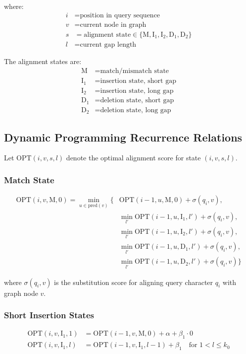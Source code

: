 \documentclass[11pt]{article}
\begin{document}
where:
\begin{align}
i &= \text{position in query sequence} \\
v &= \text{current node in graph} \\
s &= \text{alignment state} \in \{\text{M}, \text{I}_1, \text{I}_2, \text{D}_1, \text{D}_2\} \\
l &= \text{current gap length}
\end{align}

The alignment states are:
\begin{align}
\text{M} &= \text{match/mismatch state} \\
\text{I}_1 &= \text{insertion state, short gap} \\
\text{I}_2 &= \text{insertion state, long gap} \\
\text{D}_1 &= \text{deletion state, short gap} \\
\text{D}_2 &= \text{deletion state, long gap}
\end{align}

\subsection{Dynamic Programming Recurrence Relations}

Let $\text{OPT}(i, v, s, l)$ denote the optimal alignment score for state $(i, v, s, l)$.

\subsubsection{Match State}
\begin{align}
\text{OPT}(i, v, \text{M}, 0) = \min_{u \in \text{pred}(v)} \{ &\text{OPT}(i-1, u, \text{M}, 0) + \sigma(q_i, v), \\
&\min_{l'} \text{OPT}(i-1, u, \text{I}_1, l') + \sigma(q_i, v), \\
&\min_{l'} \text{OPT}(i-1, u, \text{I}_2, l') + \sigma(q_i, v), \\
&\min_{l'} \text{OPT}(i-1, u, \text{D}_1, l') + \sigma(q_i, v), \\
&\min_{l'} \text{OPT}(i-1, u, \text{D}_2, l') + \sigma(q_i, v) \}
\end{align}

where $\sigma(q_i, v)$ is the substitution score for aligning query character $q_i$ with graph node $v$.

\subsubsection{Short Insertion States}
\begin{align}
\text{OPT}(i, v, \text{I}_1, 1) &= \text{OPT}(i-1, v, \text{M}, 0) + \alpha + \beta_1 \cdot 0 \\
\text{OPT}(i, v, \text{I}_1, l) &= \text{OPT}(i-1, v, \text{I}_1, l-1) + \beta_1 \quad \text{for } 1 < l \leq k_0
\end{align}
\end{document}
